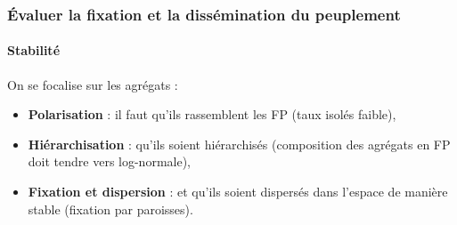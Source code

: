 \documentclass[12pt, a4paper, oneside]{book}
\begin{document}
	
	
	\subsubsection{Évaluer la fixation et la dissémination du peuplement}
	
	\paragraph{Stabilité}
	
	

	On se focalise sur les agrégats :
	\begin{itemize}
		\item \textbf{Polarisation} : il faut qu'ils rassemblent les FP (taux isolés faible),
		\item \textbf{Hiérarchisation} : qu'ils soient hiérarchisés (composition des agrégats en FP doit tendre vers log-normale),
		\item \textbf{Fixation et dispersion} : et qu'ils soient dispersés dans l'espace de manière stable (fixation par paroisses).
	\end{itemize}
\end{document}
